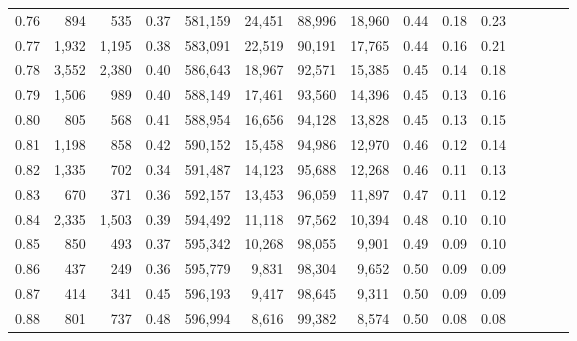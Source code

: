 \begin{tabular}{rrrcrrrrrrrrrrr}
0.76 &     894 &    535 &                                       0.37 &  581,159 &   24,451 &   88,996 &   18,960 &  0.44 &  0.18 &                         0.23 \\
0.77 &   1,932 &  1,195 &                                       0.38 &  583,091 &   22,519 &   90,191 &   17,765 &  0.44 &  0.16 &                         0.21 \\
0.78 &   3,552 &  2,380 &                                       0.40 &  586,643 &   18,967 &   92,571 &   15,385 &  0.45 &  0.14 &                         0.18 \\
0.79 &   1,506 &    989 &                                       0.40 &  588,149 &   17,461 &   93,560 &   14,396 &  0.45 &  0.13 &                         0.16 \\
0.80 &     805 &    568 &                                       0.41 &  588,954 &   16,656 &   94,128 &   13,828 &  0.45 &  0.13 &                         0.15 \\
0.81 &   1,198 &    858 &                                       0.42 &  590,152 &   15,458 &   94,986 &   12,970 &  0.46 &  0.12 &                         0.14 \\
0.82 &   1,335 &    702 &                                       0.34 &  591,487 &   14,123 &   95,688 &   12,268 &  0.46 &  0.11 &                         0.13 \\
0.83 &     670 &    371 &                                       0.36 &  592,157 &   13,453 &   96,059 &   11,897 &  0.47 &  0.11 &                         0.12 \\
0.84 &   2,335 &  1,503 &                                       0.39 &  594,492 &   11,118 &   97,562 &   10,394 &  0.48 &  0.10 &                         0.10 \\
0.85 &     850 &    493 &                                       0.37 &  595,342 &   10,268 &   98,055 &    9,901 &  0.49 &  0.09 &                         0.10 \\
0.86 &     437 &    249 &                                       0.36 &  595,779 &    9,831 &   98,304 &    9,652 &  0.50 &  0.09 &                         0.09 \\
0.87 &     414 &    341 &                                       0.45 &  596,193 &    9,417 &   98,645 &    9,311 &  0.50 &  0.09 &                         0.09 \\
0.88 &     801 &    737 &                                       0.48 &  596,994 &    8,616 &   99,382 &    8,574 &  0.50 &  0.08 &                         0.08 \\

\end{tabular}
